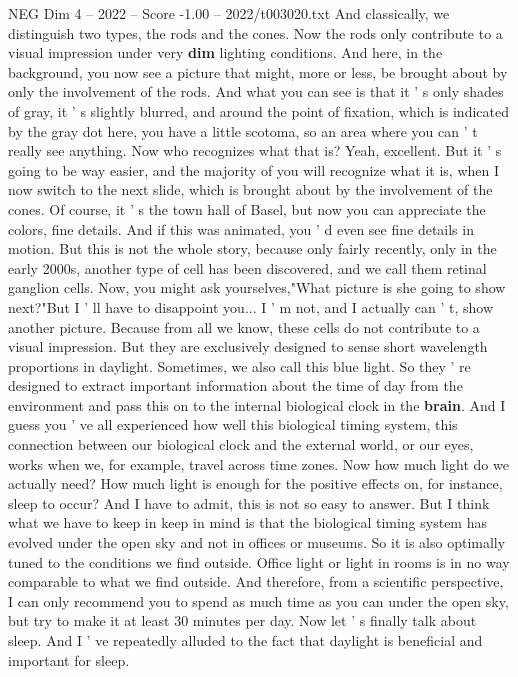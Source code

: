 \begin{textsample}{NEG Dim 4 – 2022 – Score -1.00 – 2022/t003020.txt}
And classically, we distinguish two types, the rods and the cones.
Now the rods only contribute to a visual impression under very \textbf{dim} lighting conditions.
And here, in the background, you now see a picture that might, more or less, be brought about by only the involvement of the rods.
And what you can see is that it ' s only shades of gray, it ' s slightly blurred, and around the point of fixation, which is indicated by the gray dot here, you have a little scotoma, so an area where you can ' t really see anything.
Now who recognizes what that is?
Yeah, excellent.
But it ' s going to be way easier, and the majority of you will recognize what it is, when I now switch to the next slide, which is brought about by the involvement of the cones.
Of course, it ' s the town hall of Basel, but now you can appreciate the colors, fine details.
And if this was animated, you ' d even see fine details in motion.
But this is not the whole story, because only fairly recently, only in the early 2000s, another type of cell has been discovered, and we call them retinal ganglion cells.
Now, you might ask yourselves,"What picture is she going to show next?"But I ' ll have to disappoint you...
I ' m not, and I actually can ' t, show another picture.
Because from all we know, these cells do not contribute to a visual impression.
But they are exclusively designed to sense short wavelength proportions in daylight.
Sometimes, we also call this blue light.
So they ' re designed to extract important information about the time of day from the environment and pass this on to the internal biological clock in the \textbf{brain}.
And I guess you ' ve all experienced how well this biological timing system, this connection between our biological clock and the external world, or our eyes, works when we, for example, travel across time zones.
Now how much light do we actually need?
How much light is enough for the positive effects on, for instance, sleep to occur?
And I have to admit, this is not so easy to answer.
But I think what we have to keep in keep in mind is that the biological timing system has evolved under the open sky and not in offices or museums.
So it is also optimally tuned to the conditions we find outside.
Office light or light in rooms is in no way comparable to what we find outside.
And therefore, from a scientific perspective, I can only recommend you to spend as much time as you can under the open sky, but try to make it at least 30 minutes per day.
Now let ' s finally talk about sleep.
And I ' ve repeatedly alluded to the fact that daylight is beneficial and important for sleep.

\end{textsample}
